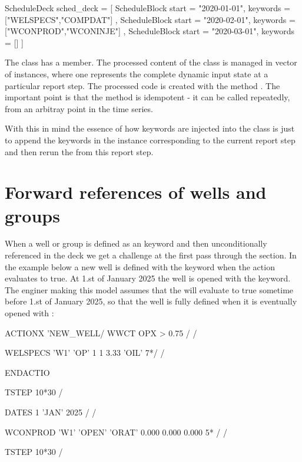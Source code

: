 \begin{code}
ScheduleDeck sched_deck = [
  ScheduleBlock {
    start = "2020-01-01",
    keywords = ["WELSPECS","COMPDAT"]
  },
  ScheduleBlock {
    start = "2020-02-01",
    keywords = ["WCONPROD","WCONINJE"]
  },
  ScheduleBlock {
    start = "2020-03-01",
    keywords = []
  }
]
\end{code}

The  class has a  member. The
processed content of the  class is managed in vector of
 instances, where one 
represents the complete dynamic input state at a particular report step. The
processed  code is created with the method
. The important point is that the
 method is idempotent - it can be
called repeatedly, from an arbitray point in the time series.

With this in mind the essence of how \actionx{} keywords are injected into the
 class is just to append the \actionx{} keywords in the
 instance corresponding to the current report step and
then rerun the  from this report
step.



\section{Forward references of wells and groups}
When a well or group is defined as an \actionx{} keyword and then
unconditionally referenced in the deck we get a challenge at the first pass
through the  section. In the example below a new well  is
defined with the  keyword when the action 
evaluates to true. At 1.st of January 2025 the well  is opened with the
 keyword. The enginer making this model assumes that the
 will evaluate to true sometime before 1.st of January
2025, so that the well is fully defined when it is eventually opened with
:
\begin{deck}
ACTIONX
   'NEW_WELL/
   WWCT OPX  > 0.75 /
/

WELSPECS
  'W1'  'OP'  1 1 3.33  'OIL' 7*/
/

ENDACTIO

TSTEP
  10*30 /

DATES
   1 'JAN' 2025 /
/

WCONPROD
 'W1'      'OPEN'      'ORAT'      0.000      0.000      0.000  5* /
/

TSTEP
  10*30 /

\end{deck}

